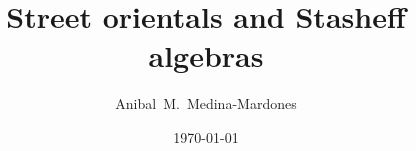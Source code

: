 \documentclass{amsart}
\title{Street orientals and Stasheff algebras}
\author[A.~Medina-Mardones]{Anibal~M.~Medina-Mardones}
\date{\today}
\begin{document}
	
	\maketitle
	
	
	
	
	
	\sloppy
	\printbibliography
\end{document}
